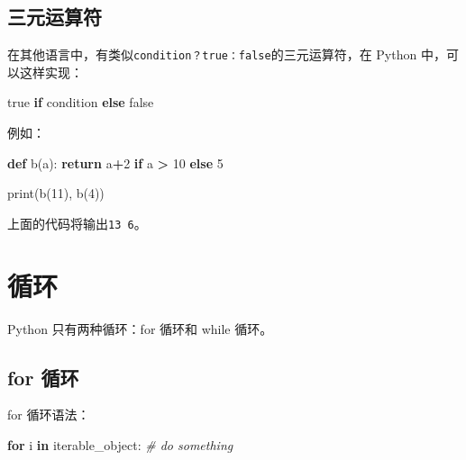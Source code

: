\documentclass[]{ctexbook}
\newenvironment{Shaded}{\begin{snugshade}}{\end{snugshade}}
\newcommand{\BuiltInTok}[1]{#1}
\newcommand{\CommentTok}[1]{\textcolor[rgb]{0.56,0.35,0.01}{\textit{#1}}}
\newcommand{\ControlFlowTok}[1]{\textcolor[rgb]{0.13,0.29,0.53}{\textbf{#1}}}
\newcommand{\DecValTok}[1]{\textcolor[rgb]{0.00,0.00,0.81}{#1}}
\newcommand{\KeywordTok}[1]{\textcolor[rgb]{0.13,0.29,0.53}{\textbf{#1}}}
\newcommand{\NormalTok}[1]{#1}
\newcommand{\OperatorTok}[1]{\textcolor[rgb]{0.81,0.36,0.00}{\textbf{#1}}}
\begin{document}
\hypertarget{ux4e09ux5143ux8fd0ux7b97ux7b26}{%
\subsection{三元运算符}\label{ux4e09ux5143ux8fd0ux7b97ux7b26}}

在其他语言中，有类似\texttt{condition？true：false}的三元运算符，在 Python 中，可以这样实现：

\begin{Shaded}
\begin{Highlighting}[]
\NormalTok{true }\ControlFlowTok{if}\NormalTok{ condition }\ControlFlowTok{else}\NormalTok{ false}
\end{Highlighting}
\end{Shaded}

例如：

\begin{Shaded}
\begin{Highlighting}[]
\KeywordTok{def}\NormalTok{ b(a):}
    \ControlFlowTok{return}\NormalTok{ a}\OperatorTok{+}\DecValTok{2} \ControlFlowTok{if}\NormalTok{ a }\OperatorTok{>} \DecValTok{10} \ControlFlowTok{else} \DecValTok{5}

\BuiltInTok{print}\NormalTok{(b(}\DecValTok{11}\NormalTok{), b(}\DecValTok{4}\NormalTok{))}
\end{Highlighting}
\end{Shaded}

上面的代码将输出\texttt{13\ 6}。

\hypertarget{ux5faaux73af}{%
\section{循环}\label{ux5faaux73af}}

Python 只有两种循环：for 循环和 while 循环。

\hypertarget{for-ux5faaux73af}{%
\subsection{for 循环}\label{for-ux5faaux73af}}

for 循环语法：

\begin{Shaded}
\begin{Highlighting}[]
\ControlFlowTok{for}\NormalTok{ i }\KeywordTok{in}\NormalTok{ iterable_object:}
   \CommentTok{# do something}
\end{Highlighting}
\end{Shaded}
\end{document}
